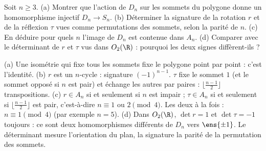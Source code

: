 \begin{exo}
Soit $n\ge3$. (a) Montrer que l'action de $D_n$ sur les sommets du polygone donne un homomorphisme injectif $D_n\to S_n$. (b) Déterminer la signature de la rotation $r$ et de la réflexion $\tau$ vues comme permutations des sommets, selon la parité de $n$. (c) En déduire pour quels $n$ l'image de $D_n$ est contenue dans $A_n$. (d) Comparer avec le déterminant de $r$ et $\tau$ vus dans $O_2(\R)$ : pourquoi les deux \og signes \fg{} diffèrent-ils ?
\begin{corrige}
(a) Une isométrie qui fixe tous les sommets fixe le polygone point par point : c'est l'identité. (b) $r$ est un $n$-cycle : signature $(-1)^{n-1}$. $\tau$ fixe le sommet $1$ (et le sommet opposé si $n$ est pair) et échange les autres par paires : $\lfloor\frac{n-1}2\rfloor$ transpositions. (c) $r\in A_n$ si et seulement si $n$ est impair ; $\tau\in A_n$ si et seulement si $\lfloor\frac{n-1}2\rfloor$ est pair, c'est-à-dire $n\equiv1$ ou $2\pmod 4$. Les deux à la fois : $n\equiv1\pmod4$ (par exemple $n=5$). (d) Dans $O_2(\R)$, $\det r=1$ et $\det\tau=-1$ toujours : ce sont deux homomorphismes différents de $D_n$ vers $\ens{\pm1}$. Le déterminant mesure l'orientation du plan, la signature la parité de la permutation des sommets.
\end{corrige}
\end{exo}
